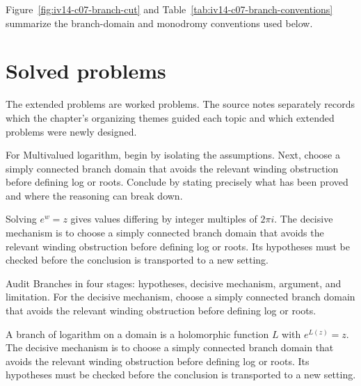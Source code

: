 Figure~\ref{fig:iv14-c07-branch-cut} and Table~\ref{tab:iv14-c07-branch-conventions}
summarize the branch-domain and monodromy conventions used below.


\section{Solved problems}
The extended problems are worked problems. The source notes separately records which the chapter's organizing themes guided each topic and which extended problems were newly designed.

\begin{problem}\label{prob:iv14-problem-01}
For Multivalued logarithm, begin by isolating the assumptions. Next, choose a simply connected branch domain that avoids the relevant winding obstruction before defining log or roots. Conclude by stating precisely what has been proved and where the reasoning can break down.
\end{problem}
\begin{solution}
Solving $e^w=z$ gives values differing by integer multiples of $2\pi i$. The decisive mechanism is to choose a simply connected branch domain that avoids the relevant winding obstruction before defining log or roots. Its hypotheses must be checked before the conclusion is transported to a new setting.
\end{solution}

\begin{problem}\label{prob:iv14-problem-02}
Audit Branches in four stages: hypotheses, decisive mechanism, argument, and limitation. For the decisive mechanism, choose a simply connected branch domain that avoids the relevant winding obstruction before defining log or roots.
\end{problem}
\begin{solution}
A branch of logarithm on a domain is a holomorphic function $L$ with $e^{L(z)}=z$. The decisive mechanism is to choose a simply connected branch domain that avoids the relevant winding obstruction before defining log or roots. Its hypotheses must be checked before the conclusion is transported to a new setting.
\end{solution}

